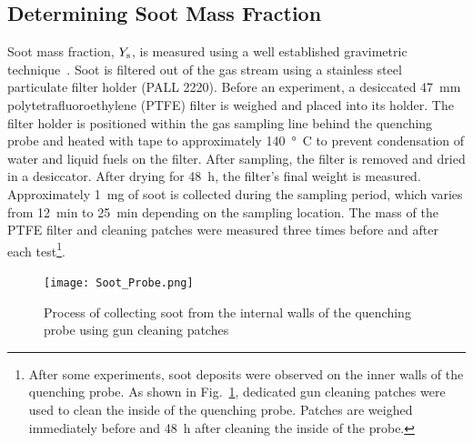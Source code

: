 \documentclass[12pt]{article}
\begin{document}
\subsection{Determining Soot Mass Fraction}
\label{ssec:Soot_Setup}

Soot mass fraction, $Y_{\rm s}$, is measured using a well established gravimetric technique~\cite{Choi1995}. Soot is filtered out of the gas stream using a stainless steel particulate filter holder (PALL 2220).  Before an experiment, a desiccated \SI{47}{mm} polytetrafluoroethylene (PTFE) filter is weighed and placed into its holder. The filter holder is positioned within the gas sampling line behind the quenching probe and heated with tape to approximately \SI{140}{\degree C} to prevent condensation of water and liquid fuels on the filter. After sampling, the filter is removed and dried in a desiccator. After drying for 48~h, the filter’s final weight is measured. Approximately \SI{1}{mg} of soot is collected during the sampling period, which varies from 12~min to 25~min depending on the sampling location. The mass of the PTFE filter and cleaning patches were measured three times before and after each test\footnote{After some experiments, soot deposits were observed on the inner walls of the quenching probe. As shown in Fig.~\ref{fig:Soot_Probe_Setup}, dedicated gun cleaning patches were used to clean the inside of the quenching probe. Patches are weighed immediately before and 48~h after cleaning the inside of the probe.}.

\begin{figure}[ht!]
	\centering
\texttt{[image: Soot\_Probe.png]}
	\caption[Process for cleaning soot probe]{Process of collecting soot from the internal walls of the quenching probe using gun cleaning patches}
	\label{fig:Soot_Probe_Setup}
\end{figure}
\end{document}
